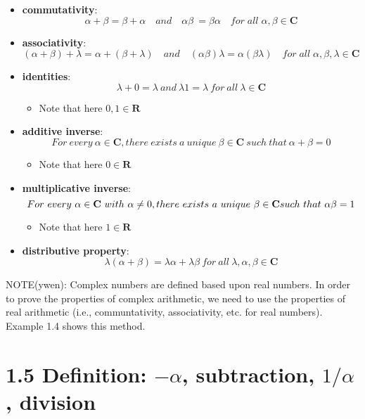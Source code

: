 \documentclass[12pt, letterpaper, oneside]{book}
\begin{document}
\begin{itemize}
  \item \textbf{commutativity}:
    \[
      \alpha + \beta = \beta + \alpha \quad and \quad \alpha\beta\ =
      \beta\alpha \quad for \; all \; \alpha, \beta \in \mathbf{C}
    \]
  \item \textbf{associativity}:
    \[
      (\alpha + \beta) + \lambda = \alpha + (\beta + \lambda) \quad and \quad
      (\alpha\beta)\lambda = \alpha(\beta\lambda) \quad for \; all \; \alpha,
      \beta, \lambda \in \mathbf{C}
    \]
  \item \textbf{identities}:
    \[
      \lambda + 0 = \lambda \ and \ \lambda1 = \lambda \ for \ all \ \lambda
      \in \mathbf{C}
    \]
    \begin{itemize}
      \item Note that here $0, 1 \in \mathbf{R}$
    \end{itemize}
  \item \textbf{additive inverse}:
    \[
      For \ every \ \alpha \in \mathbf{C}, there \ exists \ a \ unique \ \beta
      \in \mathbf{C} \ such \ that \ \alpha + \beta = 0
    \]
    \begin{itemize}
      \item Note that here $0 \in \mathbf{R}$
    \end{itemize}
  \item \textbf{multiplicative inverse}:
    \[
      For \ every \ \alpha \in \mathbf{C} \ with \ \alpha \neq 0, there \
      exists \ a \ unique \ \beta \in \mathbf{C} \newline such \ that \
      \alpha\beta = 1
    \]
    \begin{itemize}
      \item Note that here $1 \in \mathbf{R}$
    \end{itemize}
  \item \textbf{distributive property}:
    \[
      \lambda(\alpha + \beta) = \lambda\alpha + \lambda\beta \ for \ all \
      \lambda, \alpha, \beta \in \mathbf{C}
    \]
\end{itemize}

NOTE(ywen): Complex numbers are defined based upon real numbers. In order to
prove the properties of complex arithmetic, we need to use the properties of
real arithmetic (i.e., communtativity, associativity, etc. for real numbers).
Example 1.4 shows this method.

\section*{1.5 Definition: $-\alpha$, subtraction, $1/\alpha$, division}
\end{document}
